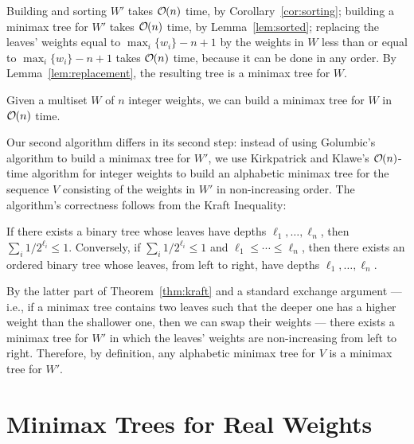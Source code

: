 \documentclass[runningheads]{llncs}
\newcommand{\Oh}[1]
    {\ensuremath{\mathcal{O} \hspace{-.5ex} \left( {#1} \right)}}
\begin{document}
\noindent Building and sorting $W'$ takes $\Oh{n}$ time, by Corollary~\ref{cor:sorting}; building a minimax tree for $W'$ takes $\Oh{n}$ time, by Lemma~\ref{lem:sorted}; replacing the leaves' weights equal to \(\max_i \{w_i\} - n + 1\) by the weights in $W$ less than or equal to \(\max_i \{w_i\} - n + 1\) takes $\Oh{n}$ time, because it can be done in any order.  By Lemma~\ref{lem:replacement}, the resulting tree is a minimax tree for $W$.

\begin{theorem} \label{thm:ints}
Given a multiset $W$ of $n$ integer weights, we can build a minimax tree for $W$ in $\Oh{n}$ time.
\end{theorem}

Our second algorithm differs in its second step: instead of using Golumbic's algorithm to build a minimax tree for $W'$, we use Kirkpatrick and Klawe's $\Oh{n}$-time algorithm for integer weights to build an alphabetic minimax tree for the sequence $V$ consisting of the weights in $W'$ in non-increasing order.  The algorithm's correctness follows from the Kraft Inequality:

\begin{theorem}[Kraft, 1949] \label{thm:kraft}
If there exists a binary tree whose leaves have depths \(\ell_1, \ldots, \ell_n\), then \(\sum_i 1 / 2^{\ell_i} \leq 1\).  Conversely, if \(\sum_i 1 / 2^{\ell_i} \leq 1\) and \(\ell_1 \leq \cdots \leq \ell_n\), then there exists an ordered binary tree whose leaves, from left to right, have depths \(\ell_1, \ldots, \ell_n\).
\end{theorem}

\noindent By the latter part of Theorem~\ref{thm:kraft} and a standard exchange argument --- i.e., if a minimax tree contains two leaves such that the deeper one has a higher weight than the shallower one, then we can swap their weights --- there exists a minimax tree for $W'$ in which the leaves' weights are non-increasing from left to right.  Therefore, by definition, any alphabetic minimax tree for $V$ is a minimax tree for $W'$.

\section{Minimax Trees for Real Weights} \label{sec:reals}
\end{document}
